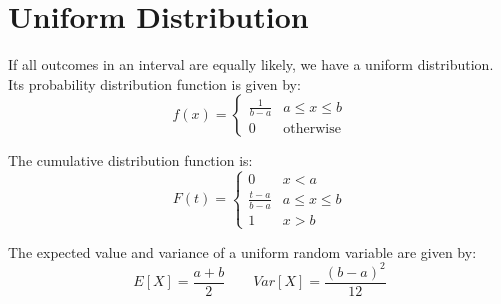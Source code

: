 \section{Uniform Distribution}

If all outcomes in an interval are equally likely, we have a uniform distribution.
Its probability distribution function is given by:
\[
f(x) = \begin{cases}
    \frac{1}{b-a} & a \leq x \leq b \\
    0 & \text{otherwise}
\end{cases}
\]

The cumulative distribution function is:
\[
F(t) = \begin{cases}
    0 & x < a \\
    \frac{t-a}{b-a} & a \leq x \leq b \\
    1 & x > b
\end{cases}
\]

The expected value and variance of a uniform random variable are given by:
\[
E[X] = \frac{a+b}{2} \qquad Var[X] = \frac{(b-a)^2}{12}
\]

